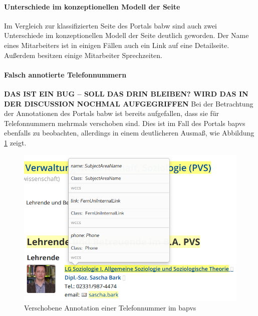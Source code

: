     \paragraph{Unterschiede im konzeptionellen Modell der Seite}
    Im Vergleich zur klassifizierten Seite des Portals \gls{babw}
    sind auch zwei Unterschiede im konzeptionellen Modell der Seite deutlich geworden.
    Der Name eines Mitarbeiters ist in einigen Fällen
    auch ein Link auf eine Detailseite.
    Außerdem besitzen einige Mitarbeiter Sprechzeiten.

    \paragraph{Falsch annotierte Telefonnummern}
    \textbf{DAS IST EIN BUG -- SOLL DAS DRIN BLEIBEN? WIRD DAS IN DER DISCUSSION NOCHMAL AUFGEGRIFFEN}
    Bei der Betrachtung der Annotationen des Portals \gls{babw}
    ist bereits aufgefallen, dass sie für Telefonnummern
    mehrmals verschoben sind.
    Dies ist im Fall des Portals \gls{bapvs} ebenfalls zu beobachten,
    allerdings in einem deutlicheren Ausmaß,
    wie Abbildung \ref{image:findingTeachersBaPVSWrongPhone} zeigt.

    \begin{figure}[htb]
        \centering
        \includegraphics[scale=\screenshotScaleFactor]{../resources/findings/case-study-1/bapvs/annotations/triple-annotation.png}
        \caption{Verschobene Annotation einer Telefonnummer im \gls{bapvs}}
        \label{image:findingTeachersBaPVSWrongPhone}
    \end{figure}

